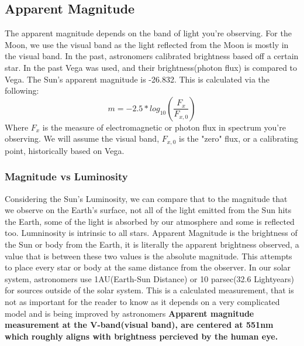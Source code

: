 \documentclass[12pt,oneside,a4paper,english]{article}
\begin{document}
\subsection{Apparent Magnitude}
The apparent magnitude depends on the band of light you're observing. For the Moon, we use the visual band as the light reflected from the Moon is mostly in the visual band. In the past, astronomers calibrated brightness based off a certain star. In the past Vega was used, and their brightness(photon flux) is compared to Vega. The Sun's apparent magnitude is -26.832. This is calculated via the following:
\begin{equation}
    m = -2.5 *log_{10}(\frac{F_x}{F_{x,0}})
\end{equation}
Where $F_x$ is the measure of electromagnetic or photon flux in spectrum you're observing. We will assume the visual band, $F_{x,0}$ is the "zero" flux, or a calibrating point, historically based on Vega.
\subsubsection{Magnitude vs Luminosity}
Considering the Sun's Luminosity, we can compare that to the magnitude that we observe on the Earth's surface, not all of the light emitted from the Sun hits the Earth, some of the light is absorbed by our atmosphere and some is reflected too. Lumninosity is intrinsic to all stars. Apparent Magnitude is the brightness of the Sun or body from the Earth, it is literally the apparent brightness observed, a value that is between these two values is the absolute magnitude. This attempts to place every star or body at the same distance from the observer. In our solar system, astronomers use 1AU(Earth-Sun Distance) or 10 parsec(32.6 Lightyears) for sources outside of the solar system. This is a calculated measurement, that is not as important for the reader to know as it depends on a very complicated model and is being improved by astronomers \textbf{Apparent magnitude measurement at the V-band(visual band), are centered at 551nm which roughly aligns with brightness percieved by the human eye.}
\end{document}
